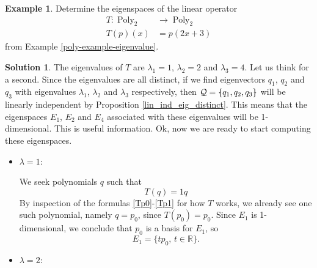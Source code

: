 \documentclass[a4paper,11pt]{book}
\theoremstyle{definition}
\newtheorem{example_environment}{Example}[chapter]
\newtheorem*{solution}{Solution}
\newcommand{\basis}[1]{{\mathcal #1}}
\newenvironment{example}
	{
		\begin{oframed} 
		\begin{example_environment}
	}
	{
		\end{example_environment}
		\end{oframed}
	}
\newcommand{\bmark}{\raisebox{.53ex}{\rule{.2em}{.1ex}}}
\newcommand{\bopen}{{\protect\ooalign{\{\cr\hfil\bmark\hfil\cr}}}
\newcommand{\bclose}{{\protect\ooalign{\}\cr\hfil\bmark\hfil\cr}}}
\DeclareMathOperator{\Poly}{Poly}
\begin{document}
\begin{example} \label{eigenspaces-lin-op-T} Determine the eigenspaces of the linear operator
\begin{align*}
 T : \Poly_2 & \rightarrow \Poly_2 \\
 T(p)(x) &= p(2x + 3)
\end{align*}
from Example \ref{poly-example-eigenvalue}.

\begin{solution} The eigenvalues of $T$ are $\lambda_1 = 1$, $\lambda_2 = 2$ and $\lambda_3 = 4$.  Let us think for a second. Since the eigenvalues are all distinct, if we find eigenvectors $q_1$, $q_2$ and $q_3$ with eigenvalues $\lambda_1$, $\lambda_2$ and $\lambda_3$ respectively, then $\basis{Q} = \bopen q_1, q_2, q_3 \bclose$ will be linearly independent by Proposition \ref{lin_ind_eig_distinct}. This means that the eigenspaces $E_1$, $E_2$ and $E_4$ associated with these eigenvalues will be 1-dimensional. This is useful information. Ok, now we are ready to start computing these eigenspaces.

\begin{itemize}
\item $\lambda = 1$: 

We seek polynomials $q$ such that
\[
 T(q) = 1 q
\]
By inspection of the formulas \eqref{Tp0}-\eqref{Tp1} for how $T$ works, we already see one such polynomial, namely $q = p_0$, since $T(p_0) = p_0$. Since $E_1$ is 1-dimensional, we conclude that $p_0$ is a basis for $E_1$, so
\[
 E_1 = \{ t p_0, \, t \in \mathbb{R}\}.
\]


\item $\lambda = 2$:


\end{itemize}
\end{solution}
\end{example}
\end{document}
